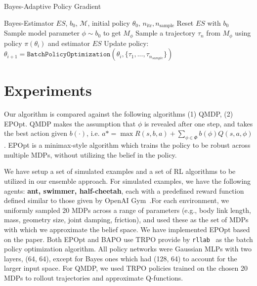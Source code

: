 \documentclass{article}
\DeclareMathOperator*{\argmin}{arg\,min}
\begin{document}
%
%
\begin{algorithm}[tb]
\caption{Bayes-Adaptive Policy Gradient}
\label{algo:bapg}
\begin{algorithmic}[1]
\Require Bayes-Estimator $ES$, $b_0$, $\mathcal{M}$, initial policy $\theta_0$, $n_\text{itr}, n_\text{sample}$
\vspace{2mm}
    \State Reset $ES$ with $b_0$
    \State Sample model parameter $\phi \sim b_0$ to get $M_{\phi}$
    \State Sample a trajectory $\tau_n$ from $M_{\phi}$ using policy $\pi(\theta_i)$ and estimator $ES$
  \EndFor
  \State Update policy: $\theta_{i+1} = \texttt{BatchPolicyOptimization}(\theta_i, \{\tau_1, ..., \tau_{n_{sample}}\})$
\EndFor
\end{algorithmic}
\end{algorithm}

\section{Experiments}

Our algorithm is compared against the following algorithms  (1) QMDP, (2) EPOpt. QMDP makes the assumption that $\phi$ is revealed after one step, and takes the best action given $b(\cdot)$, i.e. $a* = \max R(s,b,a) + \sum_{\phi\in\Phi} b(\phi)Q(s,a,\phi)$. EPOpt is a minimax-style algorithm which trains the policy to be robust across multiple MDPs, without utilizing the belief in the policy.

We have setup a set of simulated examples and a set of RL algorithms to be utilized in our ensemble approach. For simulated examples, we have the following agents: \textbf{ant, swimmer, half-cheetah}, each with a predefined reward function defined similar to those given by OpenAI Gym~\cite{openai}.For each environment, we uniformly sampled 20 MDPs across a range of parameters (e.g., body link length, mass, geometry size, joint damping, friction), and used these as the set of MDPs with which we approximate the belief space.  We have implemented EPOpt based on the paper. Both EPOpt and BAPO use TRPO provide by \texttt{rllab}~\cite{duan2016benchmarking} as the batch policy optimization algorithm. All policy networks were Gaussian MLPs with two layers, (64, 64), except for Bayes ones which had (128, 64) to account for the larger input space. For QMDP, we used TRPO policies trained on the chosen 20 MDPs to rollout trajectories and approximate Q-functions.
\end{document}
